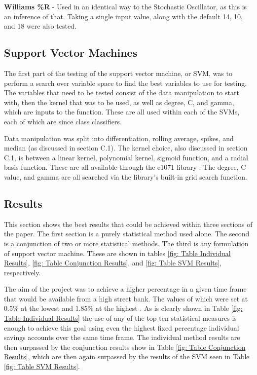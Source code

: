 \documentclass[conference]{IEEEtran}
\begin{document}
\textbf{Williams \%R} - Used in an identical way to the Stochastic Oscillator, as this is an inference of that. Taking a single input value, along with the default 14, 10, and 18 were also tested.

\subsection{Support Vector Machines}

The first part of the testing of the support vector machine, or SVM, was to perform a search over variable space to find the best variables to use for testing. The variables that need to be tested consist of the data manipulation to start with, then the kernel that was to be used, as well as degree, C, and gamma, which are inputs to the function. These are all used within each of the SVMs, each of which are since class classifiers. 

Data manipulation was split into differentiation, rolling average, spikes, and median (as discussed in section C.1). The kernel choice, also discussed in section C.1, is between a linear kernel, polynomial kernel, sigmoid function, and a radial basis function. These are all available through the e1071 library \cite{Meyer2017}. The degree, C value, and gamma are all searched via the library's built-in grid search function. 

\subsection{Results}

This section shows the best results that could be achieved within three sections of the paper. The first section is a purely statistical method used alone. The second is a conjunction of two or more statistical methods. The third is any formulation of support vector machine. These are shown in tables \ref{fig: Table Individual Results}, \ref{fig: Table Conjunction Results}, and \ref{fig: Table SVM Results}, respectively.

The aim of the project was to achieve a higher percentage in a given time frame that would be available from a high street bank. The values of which were set at 0.5\% at the lowest \cite{BankofEngland2014} and 1.85\% at the highest \cite{Murray2018}. As is clearly shown in Table  \ref{fig: Table Individual Results} the use of any of the top ten statistical measures is enough to achieve this goal using even the highest fixed percentage individual savings accounts over the same time frame. The individual method results are then surpassed by the conjunction results show in Table \ref{fig: Table Conjunction Results}, which are then again surpassed by the results of the SVM seen in Table \ref{fig: Table SVM Results}.
\end{document}
